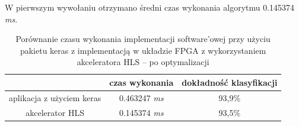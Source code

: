 \begin{table}[h] \centering
  \caption{Porównanie czasu wykonania implementacji software'owej przy użyciu pakietu keras z implementacją w układzie FPGA z wykorzystaniem akceleratora HLS -- po optymalizacji} W pierwszym wywołaniu otrzymano średni czas wykonania algorytmu 0.145374 \emph{ms}.

  \centering
  \begin{tabular} {c|c|c} \hline \label{tab:czas-wykonania2}
      
      & czas wykonania & dokładność klasyfikacji\\ \hline
     aplikacja z użyciem keras & 0.463247 \emph{ms} & 93,9\% \\
     akcelerator HLS & 0.145374 \emph{ms} & 93,5\% \\
    \end{tabular}
  \end{table}
   